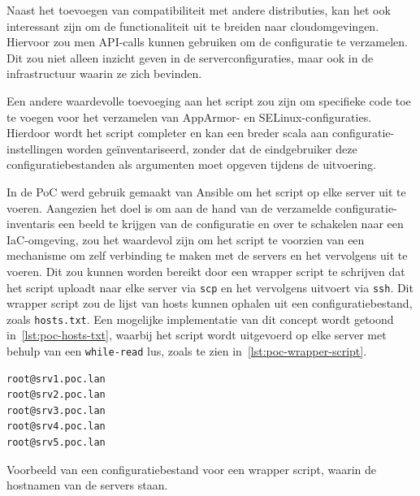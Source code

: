 Naast het toevoegen van compatibiliteit met andere distributies, kan het ook interessant zijn om de functionaliteit uit te breiden naar cloudomgevingen.
Hiervoor zou men API-calls kunnen gebruiken om de configuratie te verzamelen.
Dit zou niet alleen inzicht geven in de serverconfiguraties, maar ook in de infrastructuur waarin ze zich bevinden.

Een andere waardevolle toevoeging aan het script zou zijn om specifieke code toe te voegen voor het verzamelen van AppArmor- en SELinux-configuraties.
Hierdoor wordt het script completer en kan een breder scala aan configuratie-instellingen worden ge\"inventariseerd, zonder dat de eindgebruiker deze configuratiebestanden als argumenten moet opgeven tijdens de uitvoering.

In de PoC werd gebruik gemaakt van Ansible om het script op elke server uit te voeren.
Aangezien het doel is om aan de hand van de verzamelde configuratie-inventaris een beeld te krijgen van de configuratie en over te schakelen naar een IaC-omgeving, zou het waardevol zijn om het script te voorzien van een mechanisme om zelf verbinding te maken met de servers en het vervolgens uit te voeren.
Dit zou kunnen worden bereikt door een wrapper script te schrijven dat het script uploadt naar elke server via \texttt{scp} en het vervolgens uitvoert via \texttt{ssh}.
Dit wrapper script zou de lijst van hosts kunnen ophalen uit een configuratiebestand, zoals \texttt{hosts.txt}.
Een mogelijke implementatie van dit concept wordt getoond in~\ref{lst:poc-hosts-txt}, waarbij het script wordt uitgevoerd op elke server met behulp van een \texttt{while-read} lus, zoals te zien in~\ref{lst:poc-wrapper-script}.

\begin{listing}
  \begin{verbatim}
root@srv1.poc.lan
root@srv2.poc.lan
root@srv3.poc.lan
root@srv4.poc.lan
root@srv5.poc.lan
  \end{verbatim}
  \caption[Mogelijk configuratiebestand voor wrapper script.]{Voorbeeld van een configuratiebestand voor een wrapper script, waarin de hostnamen van de servers staan.}
  \label{lst:poc-hosts-txt}
\end{listing}

